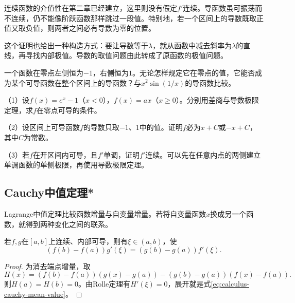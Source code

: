 连续函数的介值性在第二章已经建立，这里则没有假定\(f'\)连续。导函数虽可振荡而不连续，仍不能像阶跃函数那样跳过一段值。特别地，若一个区间上的导数既取正值又取负值，则两者之间必有导数为零的位置。

这个证明也给出一种构造方式：要让导数等于\(\lambda\)，就从函数中减去斜率为\(\lambda\)的直线，再寻找内部极值。导数的取值问题由此转成了原函数的极值问题。

\begin{example}
一个函数在零点左侧恒为\(-1\)，右侧恒为\(1\)。无论怎样规定它在零点的值，它能否成为某个可导函数在整个区间上的导函数？与\(x^2\sin(1/x)\)的导函数比较。
\end{example}

\begin{exercise}
\mbox{}\par\nobreak

（1）设\(f(x)=e^x-1\)（\(x<0\)），\(f(x)=ax\)（\(x\ge0\)）。分别用差商与导数极限定理，求\(f\)在零点可导的条件。

（2）设区间上可导函数\(f\)的导数只取\(-1\)、\(1\)中的值。证明\(f\)必为\(x+C\)或\(-x+C\)，其中\(C\)为常数。

（3）若\(f\)在开区间内可导，且\(f'\)单调，证明\(f'\)连续。可以先在任意内点的两侧建立单调函数的单侧极限，再使用导数极限定理。
\end{exercise}

\subsection{Cauchy中值定理*}

Lagrange中值定理比较函数增量与自变量增量。若将自变量函数\(x\)换成另一个函数，就得到两种变化之间的联系。

\begin{theorem}[Cauchy中值定理]\label{thm:calculus-cauchy-mean-value}
若\(f,g\)在\([a,b]\)上连续、内部可导，则有\(\xi\in(a,b)\)，使
\begin{equation}\label{eq:calculus-cauchy-mean-value}
 (f(b)-f(a))g'(\xi)=(g(b)-g(a))f'(\xi).
\end{equation}
\end{theorem}

\begin{proof}
为消去端点增量，取
\begin{equation*}
 H(x)=(f(b)-f(a))(g(x)-g(a))-(g(b)-g(a))(f(x)-f(a)).
\end{equation*}
则\(H(a)=H(b)=0\)。由Rolle定理有\(H'(\xi)=0\)，展开就是式\eqref{eq:calculus-cauchy-mean-value}。
\end{proof}

